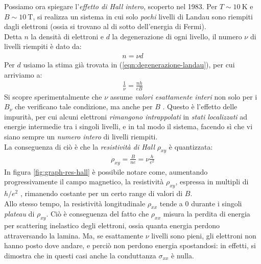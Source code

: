 \documentclass[../../FisicaTeorica.tex]{subfiles}
\begin{document}
Possiamo ora spiegare l'\textit{effetto di Hall intero}, scoperto nel 1983. Per $T\sim \SI{10}{\kelvin}$ e $B\sim \SI{10}{\tesla}$, si realizza un sistema in cui solo \textit{pochi} livelli di Landau sono riempiti dagli elettroni (ossia si trovano al di sotto dell'energia di Fermi).\\
Detta $n$ la densità di elettroni e $d$ la degenerazione di ogni livello, il numero $\nu$ di livelli riempiti è dato da:
\begin{align*}
n = \nu d
\end{align*}
Per $d$ usiamo la stima già trovata in (\ref{eqn:degenerazione-landau}), per cui arriviamo a:
\begin{align*}
\frac{1}{\nu} = \frac{nh}{eB}
\end{align*}
Si scopre sperimentalmente che $\nu$ assume \textit{valori esattamente interi} non solo per i $B_\nu$ che verificano tale condizione, ma anche per $B$ . Questo è l'effetto delle impurità, per cui alcuni elettroni \textit{rimangono intrappolati} in \textit{stati localizzati} ad energie intermedie tra i singoli livelli, e in tal modo  il sistema, facendo sì che vi siano sempre un \textit{numero intero} di livelli riempiti.\\
La conseguenza di ciò è che la \textit{resistività di Hall} $\rho_{xy}$ è quantizzata:
\begin{align*}
\rho_{xy} =\frac{B}{ne} = \nu\frac{h}{e^2}
\end{align*}
In figura \ref{fig:graph-res-hall} è possibile notare come, aumentando progressivamente il campo magnetico, la resistività $\rho_{xy}$, espressa in multipli di $h/e^2$ , rimanendo costante per un certo range di valori di $B$.\\
Allo stesso tempo, la resistività longitudinale $\rho_{xx}$ tende a $0$ durante i singoli \textit{plateau} di $\rho_{xy}$. Ciò è conseguenza del fatto che $\rho_{xx}$ misura la perdita di energia per scattering inelastico degli elettroni, ossia quanta energia perdono  attraversando la lamina. Ma, se esattamente $\nu$ livelli sono pieni, gli elettroni non hanno posto dove andare, e perciò non perdono energia spostandosi: in effetti, si dimostra che in questi casi anche la conduttanza $\sigma_{xx}$ è nulla.
\end{document}
